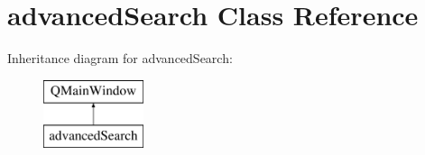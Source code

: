 \hypertarget{classadvanced_search}{}\section{advanced\+Search Class Reference}
\label{classadvanced_search}
Inheritance diagram for advanced\+Search\+:\begin{figure}[H]
\begin{center}
\leavevmode
\includegraphics[height=2.000000cm]{classadvanced_search}
\end{center}
\end{figure}
